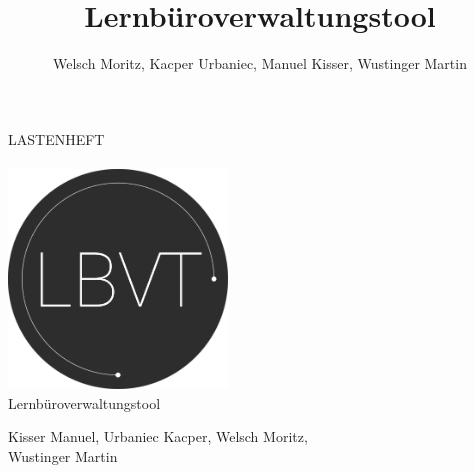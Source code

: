 \documentclass[minted, notitle]{protocol}
\title{Lernbüroverwaltungstool}
\author{Welsch Moritz, Kacper Urbaniec, Manuel Kisser, Wustinger Martin}
\begin{document}
\begin{titlepage} %
	\raggedleft %
	
	\begingroup \color{gray}{\rule{3pt}{\textheight}} \endgroup %
	\hspace{0.05\textwidth} %
	\parbox[b]{0.75\textwidth}{ %
		{{\fontsize{27}{48} \selectfont  LASTENHEFT}} \\	\vspace{0.284\textheight} \\
		
		{\includegraphics[width=220]{images/Logo_1.png}} \\[2\baselineskip]
		{{\fontsize{20}{48} \selectfont Lernbüroverwaltungstool}} \\ %
		{\vspace{-0.5cm}\large \begin{flushleft}Kisser Manuel, Urbaniec Kacper, Welsch Moritz, \\Wustinger Martin\end{flushleft}}\\ [1\baselineskip] %
		
}
\end{titlepage}
\end{document}
